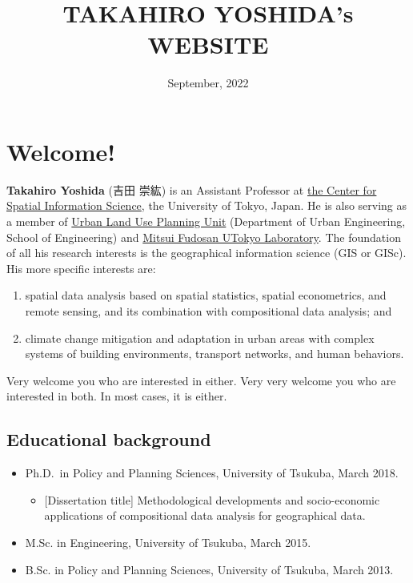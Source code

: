 \documentclass[
]{book}
\title{TAKAHIRO YOSHIDA's WEBSITE}
\author{}
\date{\vspace{-2.5em}September, 2022}
\providecommand{\tightlist}{%
  \setlength{\itemsep}{0pt}\setlength{\parskip}{0pt}}
\begin{document}
\maketitle

{
\setcounter{tocdepth}{1}
\tableofcontents
}
\hypertarget{welcome}{%
\chapter*{Welcome!}\label{welcome}}

\textbf{Takahiro Yoshida} (吉田 崇紘) is an Assistant Professor at \href{https://www.csis.u-tokyo.ac.jp/en/}{the Center for Spatial Information Science}, the University of Tokyo, Japan. He is also serving as a member of \href{https://up.t.u-tokyo.ac.jp/}{Urban Land Use Planning Unit} (Department of Urban Engineering, School of Engineering) and \href{https://mfut-lab.ducr.u-tokyo.ac.jp/}{Mitsui Fudosan UTokyo Laboratory}. The foundation of all his research interests is the geographical information science (GIS or GISc). His more specific interests are:

\begin{enumerate}
\def\labelenumi{(\arabic{enumi})}
\tightlist
\item
  spatial data analysis based on spatial statistics, spatial econometrics, and remote sensing, and its combination with compositional data analysis; and
\item
  climate change mitigation and adaptation in urban areas with complex systems of building environments, transport networks, and human behaviors.
\end{enumerate}

Very welcome you who are interested in either. Very very welcome you who are interested in both. In most cases, it is either.

\hypertarget{educational-background}{%
\section*{Educational background}\label{educational-background}}

\begin{itemize}
\tightlist
\item
  Ph.D.~in Policy and Planning Sciences, University of Tsukuba, March 2018.

  \begin{itemize}
  \tightlist
  \item
    {[}Dissertation title{]} Methodological developments and socio-economic applications of compositional data analysis for geographical data.
  \end{itemize}
\item
  M.Sc. in Engineering, University of Tsukuba, March 2015.
\item
  B.Sc. in Policy and Planning Sciences, University of Tsukuba, March 2013.
\end{itemize}
\end{document}
